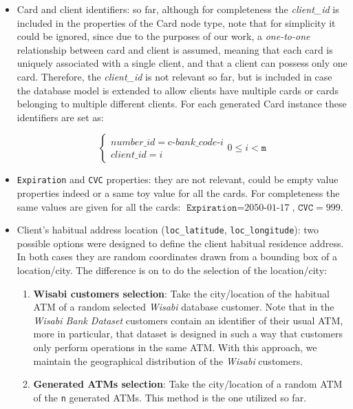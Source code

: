 \documentclass{article}
\begin{document}
\begin{itemize}
\item Card and client identifiers:
so far, although for completeness the \emph{client\_id} is included in the properties of the Card node type, note that for simplicity it could be ignored, since due to the purposes of our work, a \emph{one-to-one} relationship between card and client 
is assumed, meaning that each card is uniquely associated with a single client, and that a client
can possess only one card. Therefore, the \emph{client\_id} is not relevant so far, but is included
in case the database model is extended to allow clients have multiple cards or cards belonging to 
multiple different clients. For each generated Card instance these identifiers are set as:

\[
\begin{cases} 
number\_id = \text{c-}bank\_code\text{-}i \\
client\_id = i 
\end{cases}
0 \leq i < \texttt{m}
\]

\item \texttt{Expiration} and \texttt{CVC} properties: they are not relevant, could be empty 
  value properties indeed or a same toy value for all the cards. For completeness the  
  same values are given for all the cards: $\texttt{Expiration} = \text{2050-01-17}$, $\texttt{CVC} = 999$.

\item Client's habitual address location (\texttt{loc\_latitude}, \texttt{loc\_longitude}): two possible options were designed to define the client habitual residence address. In both 
cases they are random 
coordinates drawn from a bounding box of a location/city. The difference is on to do the selection of the location/city:

\begin{enumerate}
    \item \textbf{Wisabi customers selection}: Take the city/location of the habitual ATM of a random selected \emph{Wisabi} 
    database customer. Note that in the \emph{Wisabi Bank Dataset} customers contain an identifier
    of their usual ATM, more in particular, that dataset is designed in such a way that customers
    only perform operations in the same ATM.
    With this approach, we maintain the geographical distribution of the \emph{Wisabi} customers.
    \item \textbf{Generated ATMs selection}: Take the city/location of a random ATM of the \texttt{n} generated ATMs. This method is the one utilized so far.


\end{enumerate}
\end{itemize}
\end{document}
